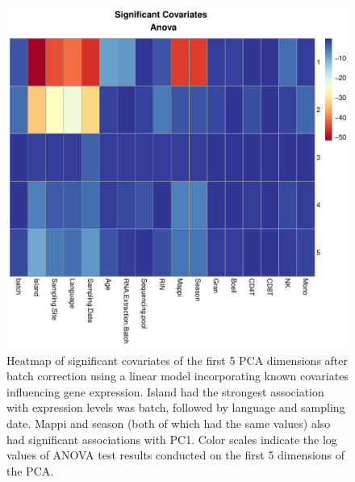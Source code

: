 \documentclass[12pt,a4paper,titlepage,twoside,openright]{book}
\begin{document}
\begin{mainmatter}
{{\begin{figure}[htb!]
\centering
\includegraphics[width=\textwidth,height=\textheight,keepaspectratio]{Figures/significantCovariates_AnovaHeatmap_removeBatcheffect.pdf}
\caption{Heatmap of significant covariates of the first 5 PCA dimensions after batch correction using a linear model incorporating known covariates influencing gene expression. Island had the strongest association with expression levels was batch, followed by language and sampling date. Mappi and season (both of which had the same values) also had significant associations with PC1. Color scales indicate the log values of ANOVA test results conducted on the first 5 dimensions of the PCA.}
\label{fig:ANOVA Remove batch effect}
\end{figure}

}}
\end{mainmatter}
\end{document}
